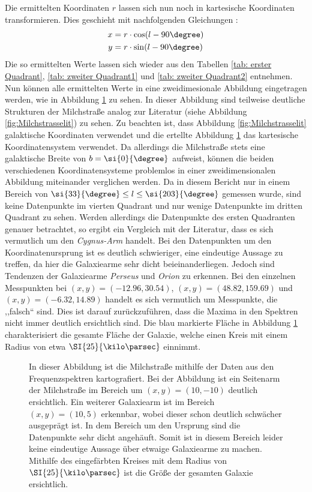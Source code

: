 Die ermittelten Koordinaten $r$ lassen sich nun noch in kartesische Koordinaten transformieren. Dies geschieht mit nachfolgenden Gleichungen \cite{H1}:
\begin{align}
    x &= r \cdot \cos(l-90\degree) \\
    y &= r \cdot \sin(l-90\degree) 
    \label{eq:umrechnung}
\end{align}
Die so ermittelten Werte lassen sich wieder aus den Tabellen \ref{tab: erster Quadrant}, \ref{tab: zweiter Quadrant1} und \ref{tab: zweiter Quadrant2} entnehmen.\newline
Nun können alle ermittelten Werte in eine zweidimesionale Abbildung eingetragen werden, wie in Abbildung \ref{fig:Milchstrassesafe} zu sehen. In dieser Abbildung sind teilweise deutliche Strukturen der Milchstraße analog zur Literatur (siehe Abbildung \ref{fig:Milchstrasselit}) zu sehen.
Zu beachten ist, dass Abbildung \ref{fig:Milchstrasselit} galaktische Koordinaten verwendet und die ertellte Abbildung \ref{fig:Milchstrassesafe} das kartesische Koordinatensystem verwendet.
Da allerdings die Milchstraße stets eine galaktische Breite von $b= \si{0}{\degree}$ aufweist, können die beiden verschiedenen Koordinatensysteme problemlos in einer zweidimensionalen Abbildung miteinander verglichen werden.\newline
Da in diesem Bericht nur in einem Bereich von $\si{33}{\degree} \le l \le \si{203}{\degree}$ gemessen wurde, sind keine Datenpunkte im vierten Quadrant und nur wenige Datenpunkte im dritten Quadrant zu sehen.
Werden allerdings die Datenpunkte des ersten Quadranten genauer betrachtet, so ergibt ein Vergleich mit der Literatur, dass es sich vermutlich um den \textit{Cygnus-Arm} handelt. Bei den Datenpunkten um den Koordinatenursprung ist es deutlich schwieriger, eine eindeutige Aussage zu treffen, da hier die Galaxiearme sehr dicht beieinanderliegen. Jedoch sind Tendenzen der Galaxiearme \textit{Perseus} und \textit{Orion} zu erkennen. Bei den einzelnen Messpunkten bei $(x,y)=(-12.96, 30.54)$, $(x,y)=(48.82, 159.69)$ und $(x,y)=(-6.32, 14.89)$ handelt es sich vermutlich um Messpunkte, die ,,falsch`` sind. Dies ist darauf zurückzuführen, dass die Maxima in den Spektren nicht immer deutlich ersichtlich sind. Die blau markierte Fläche in Abbildung \ref{fig:Milchstrassesafe} charakterisiert die gesamte Fläche der Galaxie, welche einen Kreis mit einem Radius von etwa $\SI{25}{\kilo \parsec}$ einnimmt.
\begin{figure}[H]
    \centering
       
    \caption[Abbildung der Milchstraße]{In dieser Abbildung ist die Milchstraße mithilfe der Daten aus den Frequenzspektren kartografiert. Bei der Abbildung ist ein Seitenarm der Milchstraße im Bereich um $(x,y)=(10,-10)$ deutlich ersichtlich. Ein weiterer Galaxiearm ist im Bereich $(x,y)=(10,5)$ erkennbar, wobei dieser schon deutlich schwächer ausgeprägt ist. In dem Bereich um den Ursprung sind die Datenpunkte sehr dicht angehäuft. Somit ist in diesem Bereich leider keine eindeutige Aussage über etwaige Galaxiearme zu machen. Mithilfe des eingefärbten Kreises mit dem Radius von $\SI{25}{\kilo \parsec}$ ist die Größe der gesamten Galaxie ersichtlich.}
    \label{fig:Milchstrassesafe}
\end{figure}
